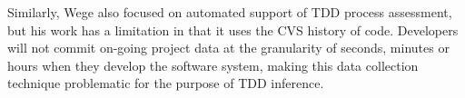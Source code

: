Similarly, Wege \cite{Wege:04} also focused on automated support of TDD
process assessment, but his work has a limitation in that it uses the CVS
history of code. Developers will not commit on-going project data at the
granularity of seconds, minutes or hours when they develop the software
system, making this data collection technique problematic for the purpose
of TDD inference.










